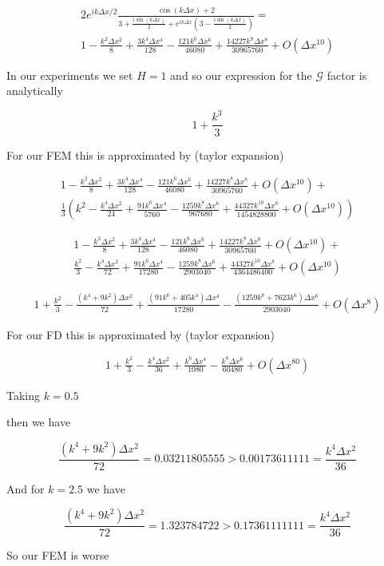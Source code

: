 \documentclass[12pt]{article}
\begin{document}
\begin{multline}
2e^{ ik\Delta x/2} \frac{\cos \left(k\Delta x\right) + 2}{3   + \frac{i\sin\left(k\Delta x\right)}{2} + e^{ik\Delta x}\left(3   - \frac{i\sin\left(k\Delta x\right)}{2}\right)} = \\ 1 - \frac{k^2 \Delta x^2}{8} + \frac{3k^4 \Delta x^4}{128} - \frac{121 k^{6} \Delta x^{6}}{46080} + \frac{14227k^{8} \Delta x^{8}}{30965760} + O(\Delta x^{10})
\end{multline}

In our experiments we set $H = 1$ and so our expression for the $\mathcal{G}$ factor is analytically 

\[1 + \frac{k^3}{3}\]

For our FEM this is approximated by (taylor expansion)

\begin{multline}
1 - \frac{k^2 \Delta x^2}{8} + \frac{3k^4 \Delta x^4}{128} - \frac{121 k^{6} \Delta x^{6}}{46080} + \frac{14227k^{8} \Delta x^{8}}{30965760} + O(\Delta x^{10}) + \\
\frac{1}{3}\left(k^2 - \frac{k^4 \Delta x^2}{24} + \frac{91k^6 \Delta x^4}{5760} - \frac{1259k^{8} \Delta x^{6}}{967680} + \frac{44327k^{10} \Delta x^{8}}{1454828800} + O(\Delta x^{10})\right)
\end{multline}

\begin{multline}
1 - \frac{k^2 \Delta x^2}{8} + \frac{3k^4 \Delta x^4}{128} - \frac{121 k^{6} \Delta x^{6}}{46080} + \frac{14227k^{8} \Delta x^{8}}{30965760} + O(\Delta x^{10}) + \\
\frac{k^2}{3} - \frac{k^4 \Delta x^2}{72} + \frac{91k^6 \Delta x^4}{17280} - \frac{1259k^{8} \Delta x^{6}}{2903040} + \frac{44327k^{10} \Delta x^{8}}{4364486400} + O(\Delta x^{10})
\end{multline}

\begin{multline}
1 + \frac{k^2}{3} - \frac{ (k^4+9k^2) \Delta x^2}{72} + \frac{(91k^6 + 405k^4) \Delta x^4}{17280} - \frac{(1259k^{8} + 7623 k^{6}) \Delta x^{6}}{2903040}  + O(\Delta x^{8})
\end{multline}

For our FD this is approximated by (taylor expansion)


\begin{multline}
1 + \frac{k^2}{3} - \frac{k^4 \Delta x^2}{36} + \frac{k^6 \Delta x^4}{1080} - \frac{k^8 \Delta x^6}{60480} + O(\Delta x^{80})
\end{multline}

Taking $k = 0.5$

then we have 

\[\frac{ (k^4+9k^2) \Delta x^2}{72} = 0.03211805555 > 0.00173611111 = \frac{k^4 \Delta x^2}{36} \]

And for $k = 2.5$ we have 

\[\frac{ (k^4+9k^2) \Delta x^2}{72} = 1.323784722 > 0.17361111111 = \frac{k^4 \Delta x^2}{36} \]

So our FEM is worse
\end{document}
